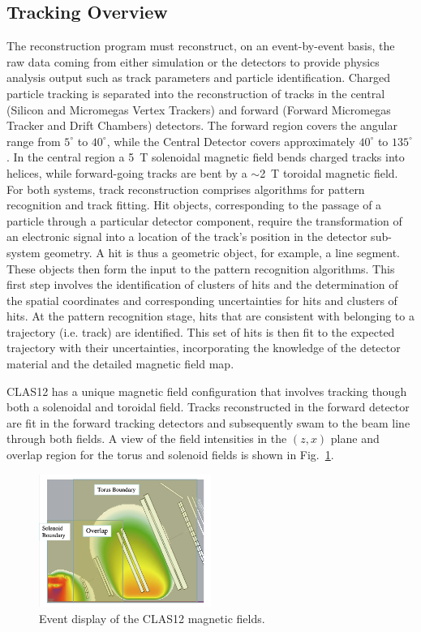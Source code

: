 \subsection{Tracking Overview}
The reconstruction program must reconstruct, on an event-by-event basis, the raw data coming from either
simulation or the detectors to provide physics analysis output such as track parameters and particle
identification. Charged particle tracking is separated into the reconstruction of tracks in the central
(Silicon and Micromegas Vertex Trackers) and forward (Forward Micromegas Tracker and Drift
Chambers) detectors. The forward region covers the angular range from $5^\circ$ to $40^\circ$, while
the Central Detector covers approximately $40^\circ$ to $135^\circ$. In the central region a 5~T
solenoidal magnetic field bends charged tracks into helices, while forward-going tracks are bent by a
$\sim$2~T toroidal magnetic field. For both systems, track reconstruction comprises algorithms for
pattern recognition and track fitting. Hit objects, corresponding to the passage of a particle through a
particular detector component, require the transformation of an electronic signal into a location of the
track's position in the detector sub-system geometry. A hit is thus a geometric object, for example, a
line segment. These objects then form the input to the pattern recognition algorithms. This first step
involves the identification of clusters of hits and the determination of the spatial coordinates and
corresponding uncertainties for hits and clusters of hits. At the pattern recognition stage, hits that are
consistent with belonging to a trajectory (i.e. track) are identified. This set of hits is then fit to the
expected trajectory with their uncertainties, incorporating the knowledge of the detector material and
the detailed magnetic field map.

CLAS12 has a unique magnetic field configuration that involves tracking though both a solenoidal and toroidal field. Tracks reconstructed in the forward detector are fit in the forward tracking detectors and subsequently swam to the beam line through both fields.  A view of the field intensities in the $(z,x)$ plane and overlap region for the torus and solenoid fields is shown in Fig.~\ref{fig:fields}.

\begin{figure}
\centering
\includegraphics[width=0.5\textwidth]{pics/Bfields.png}
\caption{Event display of the CLAS12 magnetic fields. 
}
\label{fig:fields}
\end{figure}

